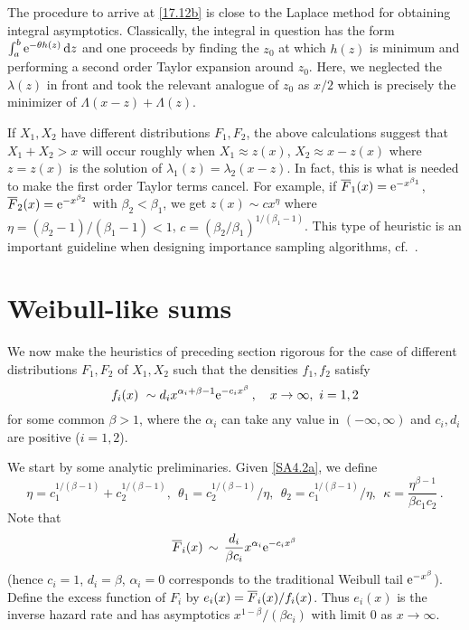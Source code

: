 \begin{remark}\label{Rem:17.12a}
The procedure to arrive at \eqref{17.12b} is close to the Laplace method for obtaining integral
asymptotics. Classically, the integral in question has the form $\int_a^b\mathrm{e}^{-\theta h(z)}\,\mathrm{d} z$
and one proceeds by finding the $z_0$ at which $h(z)$ is minimum and performing a
second order Taylor expansion around $z_0$. Here, we neglected the   $\lambda(z)$  in front
and took the relevant analogue  of $z_0$ as $x/2$ which is precisely the minimizer
of $\Lambda(x-z)+\Lambda(z)$.
\halmoss\end{remark}

\begin{remark}\label{Rem:17.12b} If $X_1,X_2$ have different distributions $F_1,F_2$, the
above calculations suggest that $X_1+X_2 > x$ will occur roughly when $X_1\approx z(x)$,
$X_2\approx x-z(x)$ where $z=z(x)$ is the solution of $\lambda_1(z)=\lambda_2(x-z)$.
In fact, this is what is needed to make the first order Taylor terms cancel. For example, if $\overline F_1(x)=\mathrm{e}^{-x^{\beta_1}}$, $\overline F_2(x)=\mathrm{e}^{-x^{\beta_2}}$
with $\beta_2<\beta_1$,
 we get $z(x)\sim cx^\eta$ where $\eta=(\beta_2-1)/(\beta_1-1)<1$,
 $c=(\beta_2/\beta_1)^{1/(\beta_1-1)}$. This type of heuristic is an
 important guideline when designing importance sampling algorithms,
 cf.~\cite[V.1,\,VI.2]{asmussen2007stochastic}.
\halmoss\end{remark}

\section{Weibull-like sums}\label{S:Sums}

We now make the heuristics of preceding section rigorous for the case of
different distributions $F_1,F_2$ of $X_1,X_2$ such
that the densities $f_1,f_2$ satisfy
\begin{equation}\label{SA4.2a} f_i(x)\ \sim d_ix^{\alpha_i+\beta-1}\e^{-c_i x^\beta}\,,\quad x\to\infty,\ i=1,2
\end{equation}
for some common $\beta>1$, where the $\alpha_i$ can take any value in $(-\infty,\infty)$ and $c_i,d_i$ are positive ($i=1,2$).



We start by some analytic preliminaries. Given \eqref{SA4.2a}, we define
\begin{equation}\label{SA4.2aa}
\eta=c_1^{1/(\beta-1)}+c_2^{1/(\beta-1)},\ \
\theta_1=c_2^{1/(\beta-1)}/\eta,\ \ \theta_2=c_1^{1/(\beta-1)}/\eta,\ \ 
\kappa=\frac{\eta^{\beta-1}}{\beta c_1c_2}\,.
\end{equation}
Note that
\begin{equation}\label{9.11d}
\displaystyle \overline F_i(x)\,\sim\,\frac{d_i}{\beta c_i}x^{\alpha_i}\mathrm{e}^{-c_i x^\beta}
\end{equation}
(hence $c_i=1$, $d_i=\beta$, $\alpha_i=0$ corresponds to the traditional Weibull tail $\mathrm{e}^{-x^\beta}$).
Define the excess function of $F_i$ by $e_i(x)=\overline F_i(x)/f_i(x)$. Thus
$e_i(x)$ is the inverse hazard rate and has asymptotics $x^{1-\beta}/(\beta c_i) $ with limit 0 as $x\to\infty$.


